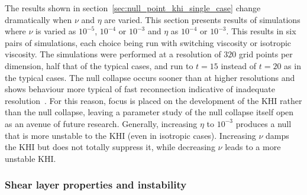 The results shown in section~\ref{sec:null_point_khi_single_case} change dramatically when $\nu$ and $\eta$ are varied. This section presents results of simulations where $\nu$ is varied as $10^{-5}$, $10^{-4}$ or $10^{-3}$ and $\eta$ as $10^{-4}$ or $10^{-3}$. This results in six pairs of simulations, each choice being run with switching viscosity or isotropic viscosity. The simulations were performed at a resolution of $320$ grid points per dimension, half that of the typical cases, and run to $t=15$ instead of $t=20$ as in the typical cases. The null collapse occurs sooner than at higher resolutions and shows behaviour more typical of fast reconnection indicative of inadequate resolution~\cite{miyamaNumericalAstrophysicsProceedings2012}. For this reason, focus is placed on the development of the KHI rather than the null collapse, leaving a parameter study of the null collapse itself open as an avenue of future research. Generally, increasing $\eta$ to $10^{-3}$ produces a null that is more unstable to the KHI (even in isotropic cases). Increasing $\nu$ damps the KHI but does not totally suppress it, while decreasing $\nu$ leads to a more unstable KHI.

\subsubsection{Shear layer properties and instability}

